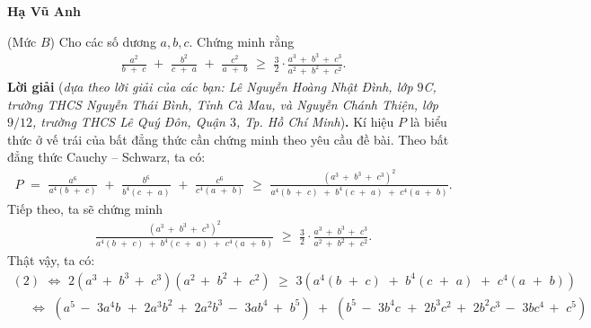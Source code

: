 \begin{multicols}{2}
{\begin{flushright}
		\textbf{Hạ Vũ Anh}
	\end{flushright}
	{}
	(Mức $B$) Cho các số dương $a, b, c$. Chứng minh rằng
	\begin{align*}
		\frac{{{a^2}}}{{b\,\, + \,\,c}}\,\, + \,\,\frac{{{b^2}}}{{c\,\, + \,\,a}}\,\, + \,\,\frac{{{c^2}}}{{a\,\, + \,\,b}}\,\, \ge \,\,\frac{3}{2} \cdot \frac{{{a^3}\, + \,\,{b^3}\, + \,\,{c^3}}}{{{a^2}\, + \,\,{b^2}\, + \,\,{c^2}}}.
	\end{align*}
	\textbf{Lời giải} (\textit{dựa theo lời giải của các bạn: Lê Nguyễn Hoàng Nhật Đình, lớp $9$C, trường THCS Nguyễn Thái Bình, Tỉnh Cà Mau, và Nguyễn Chánh Thiện, lớp $9/12$, trường THCS Lê Quý Đôn, Quận $3$, Tp. Hồ Chí Minh})\textbf{.}
	\vskip 0.05cm
	Kí hiệu $P$ là biểu thức ở vế trái của bất đẳng thức cần chứng minh theo yêu cầu đề bài.
	\vskip 0.05cm
	Theo bất đẳng thức Cauchy -- Schwarz, ta có:
	\begin{align*}
		P\,\, = \,\,\frac{{{a^6}}}{{{a^4}\left( {b\,\, + \,\,c} \right)}}\,\, + \,\,\frac{{{b^6}}}{{{b^4}\left( {c\,\, + \,\,a} \right)}}\,\, + \,\,\frac{{{c^6}}}{{{c^4}\left( {a\,\, + \,\,b} \right)}}\,\, \ge \,\,\frac{{{{\left( {{a^3}\, + \,\,{b^3}\, + \,\,{c^3}} \right)}^2}}}{{{a^4}\left( {b\,\, + \,\,c} \right)\,\, + \,\,{b^4}\left( {c\,\, + \,\,a} \right)\,\, + \,\,{c^4}\left( {a\,\, + \,\,b} \right)}}. \tag{$1$}
	\end{align*}
	Tiếp theo, ta sẽ chứng minh
	\begin{align*}
		\frac{{{{\left( {{a^3}\, + \,\,{b^3}\, + \,\,{c^3}} \right)}^2}}}{{{a^4}\left( {b\,\, + \,\,c} \right)\,\, + \,\,{b^4}\left( {c\,\, + \,\,a} \right)\,\, + \,\,{c^4}\left( {a\,\, + \,\,b} \right)}}\,\, \ge \,\,\frac{3}{2} \cdot \frac{{{a^3}\, + \,\,{b^3}\, + \,\,{c^3}}}{{{a^2}\, + \,\,{b^2}\, + \,\,{c^2}}}. \tag{$2$}
	\end{align*}
	Thật vậy, ta có:
	\begin{align*}
			\left( 2 \right)\,\, \Leftrightarrow \,\,2\left( {{a^3}\, + \,\,{b^3}\, + \,\,{c^3}} \right)\left( {{a^2}\, + \,\,{b^2}\, + \,\,{c^2}} \right)\,\, \ge \,\,3\left( {{a^4}\left( {b\,\, + \,\,c} \right)\,\, + \,\,{b^4}\left( {c\,\, + \,\,a} \right)\,\, + \,\,{c^4}\left( {a\,\, + \,\,b} \right)} \right)\\
			\,\,\,\,\,\,\,\, \Leftrightarrow \,\,\left( {{a^5}\, - \,\,3{a^4}b\,\, + \,\,2{a^3}{b^2}\, + \,\,2{a^2}{b^3}\, - \,\,3a{b^4}\, + \,\,{b^5}} \right)\,\, + \,\,\left( {{b^5}\, - \,\,3{b^4}c\,\, + \,\,2{b^3}{c^2}\, + \,\,2{b^2}{c^3}\, - \,\,3b{c^4}\, + \,\,{c^5}} \right)\\

\end{align*}}
\end{multicols}
